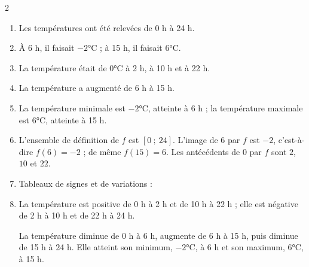 \documentclass[10pt,a4paper]{article}
\begin{document}
\begin{corr}[Guidé]{2}
\begin{enumerate}[leftmargin=*]
    \item Les températures ont été relevées de 0 h à 24 h.
    \item À 6 h, il faisait \(-2\)°C ; à 15 h, il faisait \(6\)°C.
    \item La température était de \(0\)°C à 2 h, à 10 h et à 22 h.
    \item La température a augmenté de 6 h à 15 h.
    \item La température minimale est \(-2\)°C, atteinte à 6 h ; la température maximale est \(6\)°C, atteinte à 15 h.
    \item L'ensemble de définition de \(f\) est \([0\ ;\ 24]\). L'image de \(6\) par \(f\) est \(-2\), c'est-à-dire \(f(6)=-2\) ; de même \(f(15)=6\). Les antécédents de \(0\) par \(f\) sont \(2\), \(10\) et \(22\).
    \item Tableaux de signes et de variations :
    \begin{center}

    \medskip

    \end{center}
    \item La température est positive de 0 h à 2 h et de 10 h à 22 h ; elle est négative de 2 h à 10 h et de 22 h à 24 h.

    La température diminue de 0 h à 6 h, augmente de 6 h à 15 h, puis diminue de 15 h à 24 h. Elle atteint son minimum, \(-2\)°C, à 6 h et son maximum, \(6\)°C, à 15 h.
\end{enumerate}
\end{corr}
\end{document}
